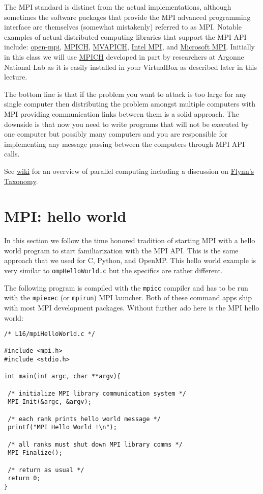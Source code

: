 The MPI standard is distinct from the actual implementations, although sometimes the software packages that provide the MPI advanced programming interface are themselves (somewhat mistakenly) referred to as MPI. Notable examples of actual distributed computing libraries that support the MPI API include: \href{https://www.open-mpi.org}{open-mpi}, \href{https://www.mpich.org}{MPICH}, \href{http://mvapich.cse.ohio-state.edu}{MVAPICH}, \href{http://software.intel.com/mpi}{Intel MPI}, and \href{https://docs.microsoft.com/en-us/message-passing-interface/microsoft-mpi}{Microsoft MPI}. Initially in this class we will use  \href{https://www.mpich.org}{MPICH} developed in part by researchers at Argonne National Lab as it is easily installed in your VirtualBox as described later in this lecture.

The bottom line is that if the problem you want to attack is too large for any single computer then distributing the problem amongst multiple computers with MPI providing communication links between them is a solid approach. The downside is that now you need to write programs that will not be executed by one computer but possibly many computers and you are responsible for implementing any message passing between the computers through MPI API calls.

See \href{https://en.wikipedia.org/wiki/Parallel_computing}{wiki} for an overview of parallel computing including a discussion on \href{https://en.wikipedia.org/wiki/Flynn%27s_taxonomy}{Flynn's Taxonomy}.

\section{MPI: hello world}

In this section we follow the time honored tradition of starting MPI with a hello world program to start familiarization with the MPI API. This is the same approach that we used for C, Python, and OpenMP. This hello world example is very similar to \texttt{ompHelloWorld.c} but the specifics are rather different.

The following program is compiled with the \texttt{mpicc} compiler and has to be run with the \texttt{mpiexec} (or \texttt{mpirun}) MPI launcher. Both of these command apps ship with most MPI development packages. Without further ado here is the MPI hello world:

\begin{verbatim}
/* L16/mpiHelloWorld.c */

#include <mpi.h>
#include <stdio.h>

int main(int argc, char **argv){

 /* initialize MPI library communication system */
 MPI_Init(&argc, &argv);
 
 /* each rank prints hello world message */
 printf("MPI Hello World !\n");
 
 /* all ranks must shut down MPI library comms */
 MPI_Finalize();
 
 /* return as usual */
 return 0;
}
\end{verbatim}

